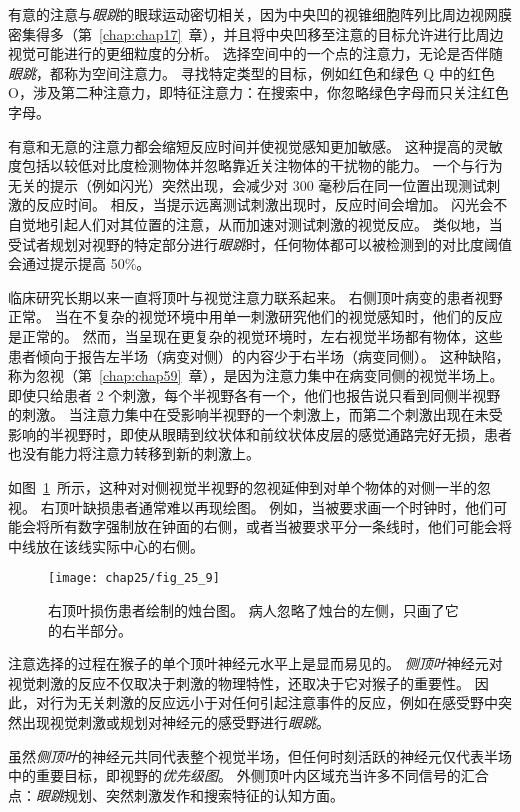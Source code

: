 有意的注意与\textit{眼跳}的眼球运动密切相关，因为中央凹的视锥细胞阵列比周边视网膜密集得多（第~\ref{chap:chap17}~章），并且将中央凹移至注意的目标允许进行比周边视觉可能进行的更细粒度的分析。
选择空间中的一个点的注意力，无论是否伴随\textit{眼跳}，都称为空间注意力。
寻找特定类型的目标，例如红色和绿色 Q 中的红色 O，涉及第二种注意力，即特征注意力：在搜索中，你忽略绿色字母而只关注红色字母。


有意和无意的注意力都会缩短反应时间并使视觉感知更加敏感。
这种提高的灵敏度包括以较低对比度检测物体并忽略靠近关注物体的干扰物的能力。
一个与行为无关的提示（例如闪光）突然出现，会减少对 300 毫秒后在同一位置出现测试刺激的反应时间。
相反，当提示远离测试刺激出现时，反应时间会增加。
闪光会不自觉地引起人们对其位置的注意，从而加速对测试刺激的视觉反应。
类似地，当受试者规划对视野的特定部分进行\textit{眼跳}时，任何物体都可以被检测到的对比度阈值会通过提示提高 50\%。


临床研究长期以来一直将顶叶与视觉注意力联系起来。
右侧顶叶病变的患者视野正常。
当在不复杂的视觉环境中用单一刺激研究他们的视觉感知时，他们的反应是正常的。
然而，当呈现在更复杂的视觉环境时，左右视觉半场都有物体，这些患者倾向于报告左半场（病变对侧）的内容少于右半场（病变同侧）。
这种缺陷，称为忽视（第~\ref{chap:chap59}~章），是因为注意力集中在病变同侧的视觉半场上。
即使只给患者 2 个刺激，每个半视野各有一个，他们也报告说只看到同侧半视野的刺激。
当注意力集中在受影响半视野的一个刺激上，而第二个刺激出现在未受影响的半视野时，即使从眼睛到纹状体和前纹状体皮层的感觉通路完好无损，患者也没有能力将注意力转移到新的刺激上。


如图~\ref{fig:25_9}~所示，这种对对侧视觉半视野的忽视延伸到对单个物体的对侧一半的忽视。
右顶叶缺损患者通常难以再现绘图。
例如，当被要求画一个时钟时，他们可能会将所有数字强制放在钟面的右侧，或者当被要求平分一条线时，他们可能会将中线放在该线实际中心的右侧。


\begin{figure}[htbp]
	\centering
	\texttt{[image: chap25/fig\_25\_9]}
	\caption{右顶叶损伤患者绘制的烛台图。
		病人忽略了烛台的左侧，只画了它的右半部分。}
	\label{fig:25_9}
\end{figure}


注意选择的过程在猴子的单个顶叶神经元水平上是显而易见的。
\textit{侧顶叶}神经元对视觉刺激的反应不仅取决于刺激的物理特性，还取决于它对猴子的重要性。
因此，对行为无关刺激的反应远小于对任何引起注意事件的反应，例如在感受野中突然出现视觉刺激或规划对神经元的感受野进行\textit{眼跳}。


虽然\textit{侧顶叶}的神经元共同代表整个视觉半场，但任何时刻活跃的神经元仅代表半场中的重要目标，即视野的\textit{优先级图}。
外侧顶叶内区域充当许多不同信号的汇合点：\textit{眼跳}规划、突然刺激发作和搜索特征的认知方面。



